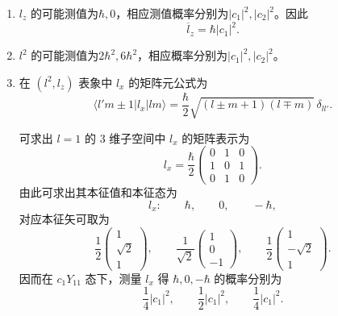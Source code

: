 \documentclass[12pt,a4paper]{article}
\begin{document}
\begin{enumerate}[label=(\alph*)]
    \item \(l_{z}\) 的可能测值为\(\hbar,0\)，相应测值概率分别为\(|c_{1}|^{2},|c_{2}|^{2}\)。因此
    \[
    \overline{l}_{z}=\hbar |c_{1}|^{2}.
    \]

    \item \(l^{2}\) 的可能测值为\(2\hbar^{2},6\hbar^{2}\)，相应概率分别为\(|c_{1}|^{2},|c_{2}|^{2}\)。

    \item 在 \((l^{2},l_{z})\) 表象中 \(l_{x}\) 的矩阵元公式为
    \[
    \langle l'm\pm 1\lvert l_{x}\rvert lm\rangle
    =
    \frac{\hbar}{2}\sqrt{(l\pm m+1)(l\mp m)}\,\delta_{ll'}.
    \]

    可求出 \(l=1\) 的 3 维子空间中 \(l_{x}\) 的矩阵表示为
    \[
    l_{x}
    =
    \frac{\hbar}{2}
    \begin{pmatrix}
    0 & 1 & 0 \\
    1 & 0 & 1 \\
    0 & 1 & 0
    \end{pmatrix}.
    \]
    由此可求出其本征值和本征态为
    \[
    l_{x}:\qquad
    \hbar,\qquad 0,\qquad -\hbar,
    \]
    对应本征矢可取为
    \[
    \frac{1}{2}
    \begin{pmatrix}
    1\\ \sqrt{2}\\ 1
    \end{pmatrix},
    \qquad
    \frac{1}{\sqrt{2}}
    \begin{pmatrix}
    1\\ 0\\ -1
    \end{pmatrix},
    \qquad
    \frac{1}{2}
    \begin{pmatrix}
    1\\ -\sqrt{2}\\ 1
    \end{pmatrix}.
    \]
    因而在 \(c_{1}Y_{11}\) 态下，测量 \(l_{x}\) 得 \(\hbar,0,-\hbar\) 的概率分别为
    \[
    \frac{1}{4}|c_{1}|^{2},\qquad
    \frac{1}{2}|c_{1}|^{2},\qquad
    \frac{1}{4}|c_{1}|^{2}.
    \]


\end{enumerate}
\end{document}
